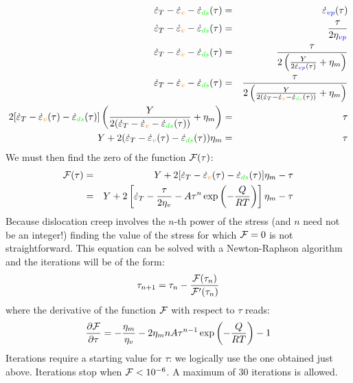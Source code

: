 \begin{enumerate}
\begin{eqnarray}
\dot\varepsilon_T 
-\dot{\varepsilon}_{\color{orange}v} 
-\dot{\varepsilon}_{\color{green}ds}(\tau) 
&=& \dot\varepsilon_{\color{blue}vp}(\tau)  \nonumber\\
\dot\varepsilon_T 
-\dot{\varepsilon}_{\color{orange}v} 
-\dot{\varepsilon}_{\color{green}ds}(\tau) 
&=& \frac{\tau}{2 \eta_{\color{blue}vp}}  \nonumber\\
\dot\varepsilon_T 
-\dot{\varepsilon}_{\color{orange}v} 
-\dot{\varepsilon}_{\color{green}ds}(\tau) 
&=& \frac{\tau}{2 \left( \frac{Y}{2\dot\varepsilon_{\color{blue}vp}(\tau)} + \eta_m  \right)} 
\nonumber\\
\dot\varepsilon_T 
-\dot{\varepsilon}_{\color{orange}v} 
-\dot{\varepsilon}_{\color{green}ds}(\tau) 
&=&
\frac{\tau}{2 \left( \frac{Y}{2 (
\dot\varepsilon_T 
-\dot{\varepsilon}_{\color{orange}v}   
-\dot{\varepsilon}_{\color{green}ds}(\tau)  )} + \eta_m  \right)} \nonumber 
\\
2 [
\dot\varepsilon_T 
-\dot{\varepsilon}_{\color{orange}v}(\tau) 
-\dot{\varepsilon}_{\color{green}ds}(\tau)
]
\left( \frac{Y}{2 (
\dot\varepsilon_T 
-\dot{\varepsilon}_{\color{orange}v} 
-\dot{\varepsilon}_{\color{green}ds}(\tau) )} + \eta_m  \right) &=& \tau 
\nonumber\\
Y + 2 (
\dot\varepsilon_T 
-\dot{\varepsilon}_{\color{orange}v}(\tau)  
-\dot{\varepsilon}_{\color{green}ds}(\tau) ) \eta_m  &=& \tau \nonumber 
\end{eqnarray}
We must then find the zero of the function ${\cal F}(\tau)$: 
\begin{eqnarray}
{\cal F}(\tau) 
&=& Y + 2 [
\dot\varepsilon_T 
-\dot{\varepsilon}_{\color{orange}v}(\tau)   
-\dot{\varepsilon}_{\color{green}ds}(\tau) 
]\eta_m -\tau \nonumber\\
&=& Y + 2 \left[ 
\dot\varepsilon_T -\frac{\tau}{2\eta_v} -A \tau^n \exp \left(-\frac{Q}{RT}\right) 
\right]\eta_m -\tau \nonumber
\end{eqnarray}
Because dislocation creep involves the $n$-th power of the stress (and $n$ need not be an integer!) 
finding the value of the stress for which ${\cal F}=0$ is not straightforward.
This equation can be solved with a Newton-Raphson algorithm
and the iterations will be of the form:
\[
\tau_{n+1} = \tau_n - \frac{{\cal F}(\tau_n)}{{\cal F}'(\tau_n)}
\]
where the derivative of the function ${\cal F}$ with respect to $\tau$ reads:
\begin{eqnarray}
\frac{\partial {\cal F}}{\partial \tau} 
= -\frac{\eta_m}{\eta_v}-2 \eta_m n A \tau^{n-1} \exp \left(-\frac{Q}{RT}\right) -1 
\end{eqnarray}
Iterations require a starting value for $\tau$: we logically use the one obtained just 
above. Iterations stop when ${\cal F}<10^{-6}$.  
A maximum of 30 iterations is allowed.


\end{enumerate}
